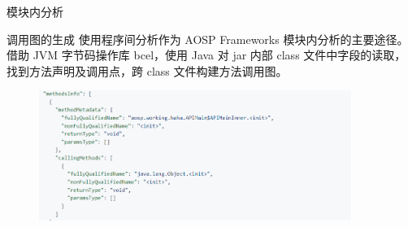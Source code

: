     \begin{frame}{模块内分析}
        \begin{block}{调用图的生成}
            \small 使用程序间分析作为 AOSP Frameworks 模块内分析的主要途径。
            借助 JVM 字节码操作库 bcel，使用 Java 对 jar 内部 class 文件中字段的读取，找到方法声明及调用点，跨 class 文件构建方法调用图。\cite{cg-generator}
        \end{block}
        \begin{figure}
            \centering \includegraphics[width=4in]{contents/figure/cg_generator_output.png}
            \label{fig:cg-genrator-output}
        \end{figure}
    \end{frame}
